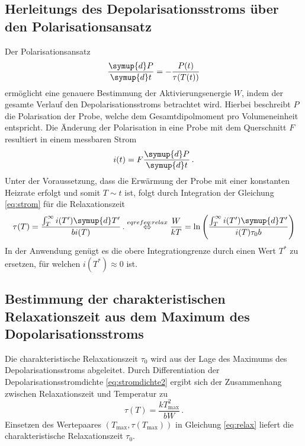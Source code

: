 \subsection*{Herleitungs des Depolarisationsstroms über den Polarisationsansatz}
Der Polarisationsansatz
\begin{equation}
    \frac{\symup{d}P}{\symup{d}t}=-\frac{P(t)}{\tau(T(t))}
\end{equation}
ermöglicht eine genauere Bestimmung der Aktivierungsenergie $W$, indem der gesamte Verlauf den Depolarisationsstroms betrachtet wird.
Hierbei beschreibt $P$ die Polarisation der Probe, welche dem Gesamtdipolmoment pro Volumeneinheit entspricht.
Die Änderung der Polarisation in eine Probe mit dem Querschnitt $F$ resultiert in einem messbaren Strom
\begin{equation}
    i(t)=F\frac{\symup{d}P}{\symup{d}t} \, .
\end{equation}
Unter der Voraussetzung, dass die Erwärmung der Probe mit einer konstanten Heizrate erfolgt und somit $T\sim t$ ist, folgt durch Integration der Gleichung \eqref{eq:strom} für die Relaxationszeit
\begin{equation}
    \tau(T)=\frac{\int_T^\infty i(T')\symup{d}T'}{bi(T)}\,.
    \stackrel{eqref{eq:relax}}{\Leftrightarrow}\frac{W}{kT} = \ln \left(\frac{\int_T^\infty i(T')\symup{d}T'}{i(T)\tau_0 b}\right)
\end{equation}
In der Anwendung genügt es die obere Integrationgrenze durch einen Wert $T^*$ zu ersetzen, für welchen $i(T^*)\approx 0$ ist.

\subsection{Bestimmung der charakteristischen Relaxationszeit aus dem Maximum des Dopolarisationsstroms}
Die charakteristische Relaxationszeit $\tau_0$ wird aus der Lage des Maximums des Depolarisationsstroms abgeleitet.
Durch Differentiation der Depolarisationsstromdichte \eqref{eq:stromdichte2} ergibt sich der Zusammenhang zwischen Relaxationszeit und Temperatur zu
\begin{equation}
    \tau(T)=\frac{kT_\text{max}^2}{bW} \,.
\end{equation}
Einsetzen des Wertepaares $(T_\text{max}, \tau(T_\text{max}))$ in Gleichung \eqref{eq:relax} liefert die charakteristische Relaxationszeit $\tau_0$.



